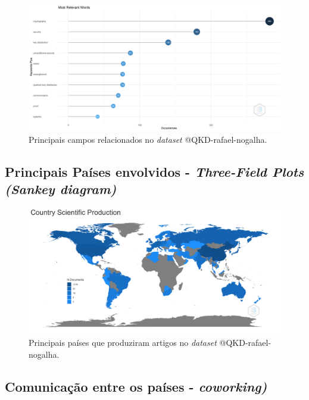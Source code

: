 \begin{figure}[H]
    \centering
    \includegraphics[width=1\textwidth]{experiments/rafaelnogalha/PesquisaBibliografica/QKDSegurancaComputacional/images/palavras-relevantes.png}
    \caption{Principais campos relacionados no \textit{dataset} @QKD-rafael-nogalha.}
    \label{fig:campos:plot:@QKD-rafael-nogalha}
\end{figure}



\subsection{Principais Países envolvidos - \textit{Three-Field Plots (Sankey diagram)}}

\begin{figure}[H]
    \centering
    \includegraphics[width=1\textwidth]{experiments/rafaelnogalha/PesquisaBibliografica/QKDSegurancaComputacional/images/especificacao-paises-producao.png}
    \caption{Principais países que produziram artigos no \textit{dataset} @QKD-rafael-nogalha.}
    \label{fig:map:prod:@QKD-rafael-nogalha}
\end{figure}



\subsection{Comunicação entre os países - \textit{coworking)}}

